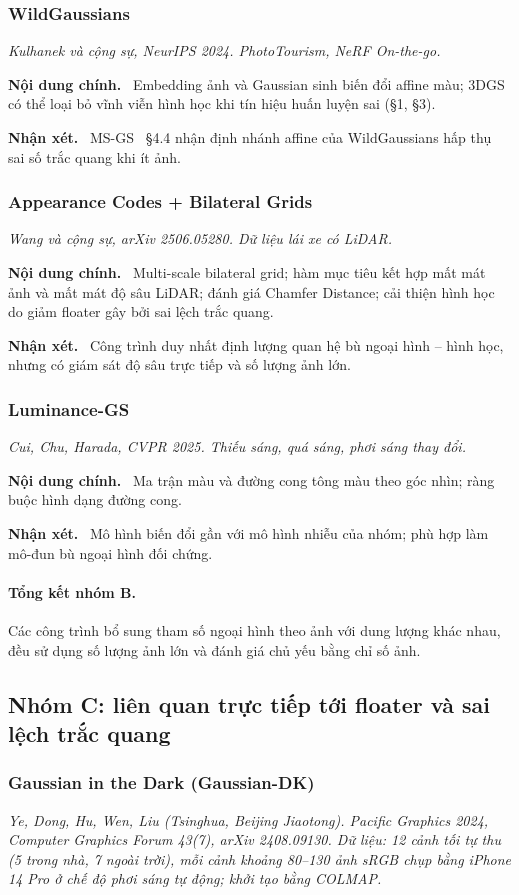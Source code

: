 \documentclass[11pt,a4paper]{article}
\newcommand{\papersays}{\par\smallskip\noindent\textbf{\color{paper}Nội dung chính.}~}
\newcommand{\wesay}{\par\smallskip\noindent\textbf{\color{nhom}Nhận xét.}~}
\newcommand{\info}[1]{\par\noindent\textit{#1}\par\smallskip}
\begin{document}
\subsubsection{WildGaussians~\cite{wildgaussians}}
\info{Kulhanek và cộng sự, NeurIPS 2024. PhotoTourism, NeRF On-the-go.}
\papersays
Embedding ảnh và Gaussian sinh biến đổi affine màu; 3DGS có thể loại bỏ vĩnh viễn hình học khi tín hiệu huấn luyện sai (§1, §3).
\wesay
MS-GS~\cite{msgs} §4.4 nhận định nhánh affine của WildGaussians hấp thụ sai số trắc quang khi ít ảnh.

\subsubsection{Appearance Codes + Bilateral Grids~\cite{unifying}}
\info{Wang và cộng sự, arXiv 2506.05280. Dữ liệu lái xe có LiDAR.}
\papersays
Multi-scale bilateral grid; hàm mục tiêu kết hợp mất mát ảnh và mất mát độ sâu LiDAR; đánh giá Chamfer Distance; cải thiện hình học do giảm floater gây bởi sai lệch trắc quang.
\wesay
Công trình duy nhất định lượng quan hệ bù ngoại hình -- hình học, nhưng có giám sát độ sâu trực tiếp và số lượng ảnh lớn.

\subsubsection{Luminance-GS~\cite{luminancegs}}
\info{Cui, Chu, Harada, CVPR 2025. Thiếu sáng, quá sáng, phơi sáng thay đổi.}
\papersays
Ma trận màu và đường cong tông màu theo góc nhìn; ràng buộc hình dạng đường cong.
\wesay
Mô hình biến đổi gần với mô hình nhiễu của nhóm; phù hợp làm mô-đun bù ngoại hình đối chứng.

\paragraph{Tổng kết nhóm B.} Các công trình bổ sung tham số ngoại hình theo ảnh với dung lượng khác nhau, đều sử dụng số lượng ảnh lớn và đánh giá chủ yếu bằng chỉ số ảnh.

\subsection{Nhóm C: liên quan trực tiếp tới floater và sai lệch trắc quang}

\subsubsection{Gaussian in the Dark (Gaussian-DK)~\cite{gaussiandk}}
\info{Ye, Dong, Hu, Wen, Liu (Tsinghua, Beijing Jiaotong). Pacific Graphics 2024, Computer Graphics Forum 43(7), arXiv 2408.09130. Dữ liệu: 12 cảnh tối tự thu (5 trong nhà, 7 ngoài trời), mỗi cảnh khoảng 80--130 ảnh sRGB chụp bằng iPhone 14 Pro ở chế độ phơi sáng tự động; khởi tạo bằng COLMAP.}
\end{document}
